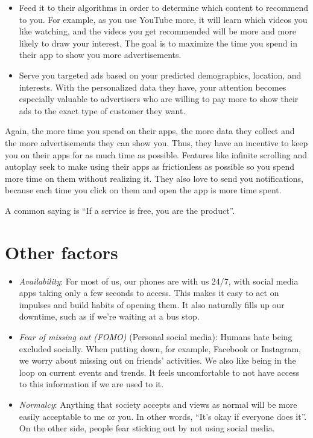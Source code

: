 \documentclass[
  openany]{book}
\providecommand{\tightlist}{%
  \setlength{\itemsep}{0pt}\setlength{\parskip}{0pt}}
\newenvironment{rmdcaution}{
\color{red}
\begin{framed}}{\end{framed}}
\begin{document}
\begin{itemize}
\tightlist
\item
  Feed it to their algorithms in order to determine which content to recommend to you. For example, as you use YouTube more, it will learn which videos you like watching, and the videos you get recommended will be more and more likely to draw your interest. The goal is to maximize the time you spend in their app to show you more advertisements.
\item
  Serve you targeted ads based on your predicted demographics, location, and interests. With the personalized data they have, your attention becomes especially valuable to advertisers who are willing to pay more to show their ads to the exact type of customer they want.
\end{itemize}

Again, the more time you spend on their apps, the more data they collect and the more advertisements they can show you. Thus, they have an incentive to keep you on their apps for as much time as possible. Features like infinite scrolling and autoplay seek to make using their apps as frictionless as possible so you spend more time on them without realizing it. They also love to send you notifications, because each time you click on them and open the app is more time spent.

\begin{rmdcaution}
A common saying is ``If a service is free, you are the product''.

\end{rmdcaution}

\section{Other factors}\label{other-factors}

\begin{itemize}
\tightlist
\item
  \emph{Availability}: For most of us, our phones are with us 24/7, with social media apps taking only a few seconds to access. This makes it easy to act on impulses and build habits of opening them. It also naturally fills up our downtime, such as if we're waiting at a bus stop.
\item
  \emph{Fear of missing out (FOMO)} (Personal social media): Humans hate being excluded socially. When putting down, for example, Facebook or Instagram, we worry about missing out on friends' activities. We also like being in the loop on current events and trends. It feels uncomfortable to not have access to this information if we are used to it.
\item
  \emph{Normalcy}: Anything that society accepts and views as normal will be more easily acceptable to me or you. In other words, ``It's okay if everyone does it''. On the other side, people fear sticking out by not using social media.
\end{itemize}
\end{document}

